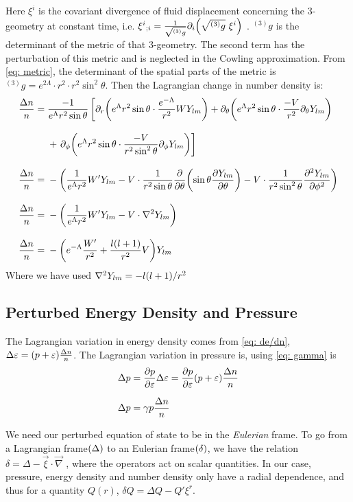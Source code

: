 \documentclass[a4paper,12pt,onehalfspacing]{report}
\begin{document}
Here $\xi^i$ is the covariant divergence of fluid displacement concerning the 3-geometry at constant time, i.e. $\xi^i{}_{;i}= \frac{1}{\sqrt{{}^{(3)}g}}\partial_i\qty(\sqrt{{}^{(3)}g}\ \xi^i)$ \cite{Weinberg}. ${}^{(3)}g$ is the determinant of the metric of that 3-geometry. The second term has the perturbation of this metric and is neglected in the Cowling approximation. From \cref{eq: metric}, the determinant of the spatial parts of the metric is ${}^{(3)}g= e^{2\Lambda}\cdot r^2\cdot r^2\sin^2\theta$. Then the Lagrangian change in number density is: 
\begin{align}
    \frac{\Delta n}{n}={}& \frac{-1}{e^{\Lambda}r^2\sin\theta}\left[\partial_{r}\qty(e^{\Lambda}r^2\sin\theta\cdot\frac{e^{-\Lambda}}{r^2}W Y_{lm})+\partial_{\theta}\qty(e^{\Lambda}r^2\sin\theta\cdot\frac{-V}{r^2} \partial_\theta Y_{lm})\right.\nonumber\\[2ex]
    &+\left.\partial_{\phi}\qty(e^{\Lambda}r^2\sin\theta\cdot\frac{-V}{r^2\sin^2\theta} \partial_\phi Y_{lm})\right]\nonumber\\[2ex]
    \frac{\Delta n}{n}={}& -\qty(\frac{1}{e^{\Lambda}r^2}W' Y_{lm}-V\cdot\frac{1}{r^2\sin\theta}\pdv{}{\theta}\qty(\sin\theta \pdv{Y_{lm}}{\theta})\nonumber-V\cdot\frac{1}{r^2\sin^2\theta}\pdv[2]{Y_{lm}}{\phi})\nonumber\\[2ex]
    \frac{\Delta n}{n}={}& -\qty(\frac{1}{e^{\Lambda}r^2}W' Y_{lm}-{V}\cdot\laplacian Y_{lm})\nonumber\\[2ex]
    \frac{\Delta n}{n}={}&-\qty(e^{-\Lambda}\frac{W'}{r^2}+\frac{l(l+1)}{r^2}V)Y_{lm}\label{eq: dn/n} 
\end{align} 
Where we have used $\laplacian Y_{lm}= {-l(l+1)}/{r^2}$
\subsection{Perturbed Energy Density and Pressure}

The Lagrangian variation in energy density comes from \cref{eq: de/dn}, $\Delta \varepsilon= \qty(p+\varepsilon)\frac{\Delta n}{n}$. The Lagrangian variation in pressure is, using \cref{eq: gamma} is
\begin{align*}
    \Delta p &= \pdv{p}{\varepsilon}\Delta \varepsilon= \pdv{p}{\varepsilon}\qty(p+\varepsilon)\frac{\Delta n}{n}\\[1.5ex]
    \Delta p &= \gamma p\frac{\Delta n}{n}
\end{align*}

We need our perturbed equation of state to be in the \emph{Eulerian} frame. To go from a Lagrangian frame$\qty(\Delta)$ to an Eulerian frame$\qty(\delta)$, we have the relation $\delta= \Delta- \vec{\xi}\cdot \vec{\nabla}$ \cite{Shapiro_T}, where the operators act on scalar quantities. In our case, pressure, energy density and number density only have a radial dependence, and thus for a quantity $Q(r)$, $\delta Q= \Delta Q- Q'\xi^r$.
\end{document}
